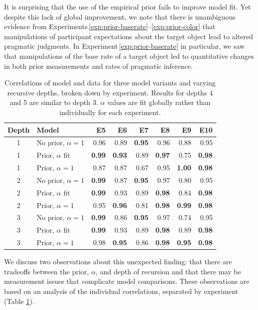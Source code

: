 \documentclass[man,noapacite]{apa2}
\newcounter{Experiment}
\newcommand{\exptref}[1]{Experiment\,\ref{#1}}
\newcommand{\exptrefrange}[2]{Experiments\,\ref{#1}--\ref{#2}}
\begin{document}
It is surprising that the use of the empirical prior fails to improve model fit. Yet despite this lack of global improvement, we note that there is unambiguous evidence from \exptrefrange{exp:prior-baserate}{exp:prior-color} that manipulations of participant expectations about the target object lead to altered pragmatic judgments. In \exptref{exp:prior-baserate} in particular, we saw that manipulations of the base rate of a target object led to quantitative changes in both prior measurements and rates of pragmatic inference.

\begin{table}[ht]
\centering
\begin{tabular}{clrrrrrr}
  \hline
Depth & Model & E5 & E6 & E7 & E8 & E9 & E10 \\
  \hline
  1 & No prior, $\alpha=1$ & 0.96 & 0.89 & {\bf 0.95} & 0.96 & 0.88 & 0.95 \\
    1 & Prior, $\alpha$ fit & {\bf 0.99} & {\bf 0.93} & 0.89 & {\bf 0.97} & 0.75 & {\bf 0.98} \\
    1 & Prior, $\alpha=1$ & 0.87 & 0.87 & 0.67 & 0.95 & {\bf 1.00} & {\bf 0.98} \\
  \hline
    2 & No prior, $\alpha=1$ & {\bf 0.99} & 0.87 & {\bf 0.95} & 0.97 & 0.80 & 0.95 \\
    2 & Prior, $\alpha$ fit & {\bf 0.99} & 0.93 & 0.89 & {\bf 0.98} & 0.84 & {\bf 0.98} \\
    2 & Prior, $\alpha=1$ & 0.95 & {\bf 0.96} & 0.81 & {\bf 0.98} & {\bf 0.99} & {\bf 0.98} \\
  \hline
    3 & No prior, $\alpha=1$ & {\bf 0.99} & 0.86 & {\bf 0.95} & 0.97 & 0.74 & 0.95 \\
    3 & Prior, $\alpha$ fit & {\bf 0.99} & 0.93 & 0.89 & {\bf 0.98} & 0.89 & {\bf 0.98} \\
    3 & Prior, $\alpha=1$ & 0.98 & {\bf 0.95} & 0.86 & {\bf 0.98} & {\bf 0.95} & {\bf 0.98} \\
  \hline
\end{tabular}
\caption{\label{tab:expts-corrs} Correlations of model and data for three model variants and varying recursive depths, broken down by experiment. Results for depths 4 and 5 are similar to depth 3. $\alpha$ values are fit globally rather than individually for each experiment.}
\end{table}

We discuss two observations about this unexpected finding: that there are tradeoffs between the prior, $\alpha$, and depth of recursion and that there may be measurement issues that complicate model comparisons. These observations are based on an analysis of the individual correlations, separated by experiment (Table \ref{tab:expts-corrs}).
\end{document}
